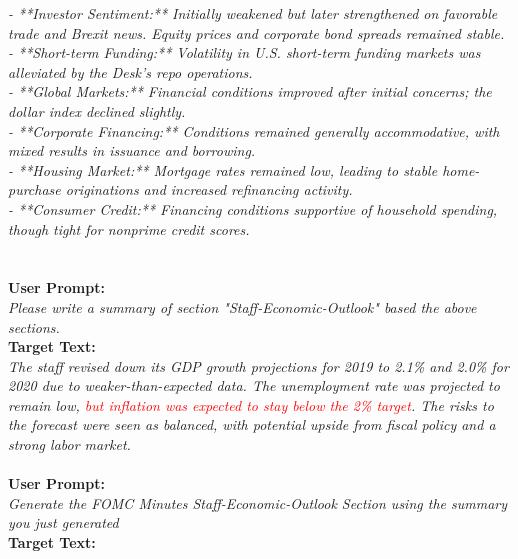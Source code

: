 {\footnotesize
\textit{
    - **Investor Sentiment:** Initially weakened but later strengthened on favorable trade and Brexit news. Equity prices and corporate bond spreads remained stable.\\
    - **Short-term Funding:** Volatility in U.S. short-term funding markets was alleviated by the Desk's repo operations.\\
    - **Global Markets:** Financial conditions improved after initial concerns; the dollar index declined slightly.\\
    - **Corporate Financing:** Conditions remained generally accommodative, with mixed results in issuance and borrowing.\\
    - **Housing Market:** Mortgage rates remained low, leading to stable home-purchase originations and increased refinancing activity.\\
    - **Consumer Credit:** Financing conditions supportive of household spending, though tight for nonprime credit scores.\\
}}\\
~\\
\textbf{User Prompt:}\\
{\footnotesize
\textit{
    Please write a summary of section "Staff-Economic-Outlook" based the above sections.
}}\\
\textbf{Target Text:}\\
{\footnotesize
\textit{
    The staff revised down its GDP growth projections for 2019 to 2.1\% and 2.0\% for 2020 due to weaker-than-expected data. The unemployment rate was projected to remain low, \textcolor{red}{but inflation was expected to stay below the 2\% target}. The risks to the forecast were seen as balanced, with potential upside from fiscal policy and a strong labor market.
}}\\
~\\
\textbf{User Prompt:}\\
{\footnotesize
\textit{Generate the FOMC Minutes Staff-Economic-Outlook Section using the summary you just generated}}\\
\textbf{Target Text:}\\
